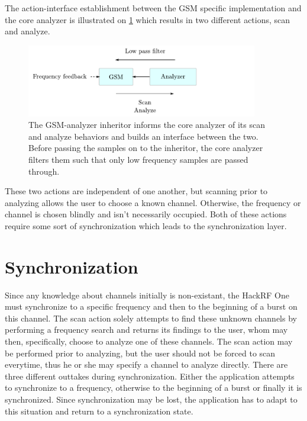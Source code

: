 The action-interface establishment between the GSM specific
implementation and the core analyzer is illustrated on
\cref{fig:analyzer_interface} which results in two different actions,
scan and analyze.

\begin{figure}[H]
  \centering
  \includegraphics[width=0.9\textwidth]{figures/analyzer_interface}
  \caption{The \gls{GSM}-analyzer inheritor informs the core analyzer
    of its scan and analyze behaviors and builds an interface between
    the two. Before passing the samples on to the inheritor, the core
    analyzer filters them such that only low frequency samples are
    passed through.}
  \label{fig:analyzer_interface}
\end{figure}

These two actions are independent of one another, but scanning prior
to analyzing allows the user to choose a known channel. Otherwise, the
frequency or channel is chosen blindly and isn't necessarily
occupied. Both of these actions require some sort of synchronization
which leads to the synchronization layer.

\section{Synchronization}
Since any knowledge about channels initially is non-existant, the
HackRF One must synchronize to a specific frequency and then to the
beginning of a burst on this channel. The scan action solely attempts
to find these unknown channels by performing a frequency search and
returns its findings to the user, whom may then, specifically, choose
to analyze one of these channels. The scan action may be performed
prior to analyzing, but the user should not be forced to scan
everytime, thus he or she may specify a channel to analyze
directly. There are three different outtakes during
synchronization. Either the application attempts to synchronize to a
frequency, otherwise to the beginning of a burst or finally it is
synchronized. Since synchronization may be lost, the application
has to adapt to this situation and return to a synchronization state.

